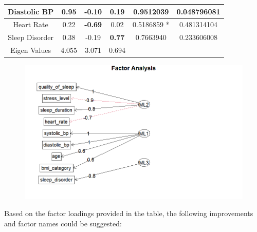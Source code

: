 \documentclass[11pt]{article}
\begin{document}
\begin{table}[h]
{\begin{tabular}{|c|ccc|cc}
					Diastolic BP                                                             & \multicolumn{1}{c|}{\textbf{0.95}}     & \multicolumn{1}{c|}{-0.10}             & 0.19             & \multicolumn{1}{c|}{0.9512039}              & \multicolumn{1}{c|}{0.048796081}                 \\ \hline
					Heart Rate                                                               & \multicolumn{1}{c|}{0.22}              & \multicolumn{1}{c|}{\textbf{-0.69}}    & 0.02             & \multicolumn{1}{c|}{0.5186859 *}            & \multicolumn{1}{c|}{0.481314104}                 \\ \hline
					Sleep Disorder                                                           & \multicolumn{1}{c|}{0.38}              & \multicolumn{1}{c|}{-0.19}             & \textbf{0.77}    & \multicolumn{1}{c|}{0.7663940}              & \multicolumn{1}{c|}{0.233606008}                 \\ \hline
					Eigen Values                                                             & \multicolumn{1}{c|}{4.055}             & \multicolumn{1}{c|}{3.071}             & 0.694            &                               &                                                  \\ \cline{1-4}
				\end{tabular}%
			}
			\label{tab:fa_varimax_ml_summary}
		\end{table}
		
		\begin{figure}[h]
			\centering
			\includegraphics[width=0.7\linewidth]{Images/fa_variax_ml}
			\label{fig:favariaxpa}
		\end{figure}
		
		Based on the factor loadings provided in the table, the following improvements and factor names could be suggested: 
		
\end{document}
